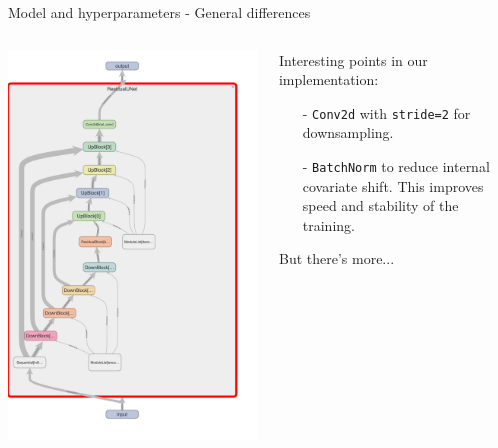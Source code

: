 \documentclass[footline=authortitle]{beamer}
\begin{document}
\begin{frame}{Model and hyperparameters - General differences}
    \begin{columns}
        \begin{column}{0.45\textwidth}
            \includegraphics[width=0.6\textheight]{images/unet_experiment_graph.png}
        \end{column}
        \begin{column}{0.55\textwidth}
            Interesting points in our implementation:
            \begin{itemize}
                \item[-] \texttt{Conv2d} with \texttt{stride=2} for downsampling.
                \item[-] \texttt{BatchNorm} to reduce internal covariate shift. This improves speed and stability of the training.
            \end{itemize}
            But there's more...
        \end{column}
    \end{columns}
\end{frame}
\end{document}
